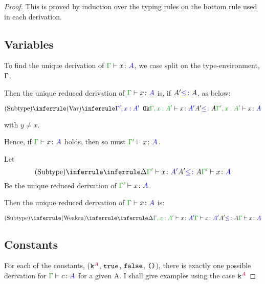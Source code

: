 \documentclass{report}
\begin{document}
\begin{framed}
    \begin{proof}
        This is proved by induction over the typing rules on the bottom rule used in each derivation.
        \subsection{Variables}
        To find the unique derivation of $\gtyperelation{x}{A}$, we case split on the type-environment, $\Gamma$.
        
        Then the unique reduced derivation of $\gtyperelation{x}{A}$ is, if $A' {\color{blue} \leq\colon} A$, as below:
        
        \begin{equation}
            \ntreeruleII{\vsubtype}{\ntreeruleI{\vvar}{\ok{\G', x: A'}}{\typerelation{\G,x: A'}{x}{A'}}}{ A' \subtype A}{\typerelation{\G', x: A'}{x}{A}}
        \end{equation}
        
         with $y \neq x$.
        
        Hence, if $\gtyperelation{x}{A}$ holds, then so must $\typerelation{\G'}{x}{A}$.
        
        Let 
        \begin{equation}
            \deltavrule{\G'}{x}{A'}{A}
        \end{equation}
        Be the  unique reduced derivation of $\typerelation{\G'}{x}{A}$.
        
        Then the unique reduced derivation of $\gtyperelation{x}{A}$ is:
        
        
        \begin{equation}
            \ntreeruleII{\vsubtype}{
                \ntreeruleI{\vweaken}{
                    \treeruleI{\D}{\typerelation{\G, x: A'}{x}{A'}}
                }{\gtyperelation{x}{A'}}   
            }{ A' \subtype A
            }{\gtyperelation{x}{A}}
        \end{equation}
        
        \subsection{Constants}
        For each of the constants, ($\texttt{k}^{\color{purple} A}$, $\texttt{true}$, $\texttt{false}$, $\texttt{()}$), there is exactly one possible derivation for $\typerelation{\G}{c}{A}$ for a given A. I shall give examples using the case $\texttt{k}^{\color{purple} A}$
        

\end{proof}
\end{framed}
\end{document}
